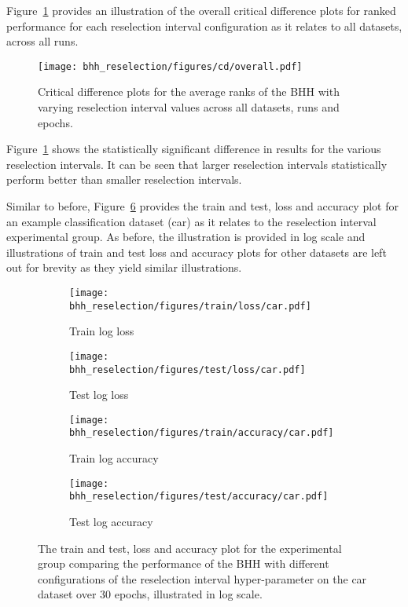 Figure~\ref{fig:results:reselection:descriptive:cd} provides an illustration of the overall critical difference plots for ranked performance for each reselection interval configuration as it relates to all datasets, across all runs.

\begin{figure}[htbp]
	\centering
	\texttt{[image: bhh\_reselection/figures/cd/overall.pdf]}
	\caption{Critical difference plots for the average ranks of the \acs{BHH} with varying reselection interval values across all datasets, runs and epochs.}
	\label{fig:results:reselection:descriptive:cd}
\end{figure}

Figure~\ref{fig:results:reselection:descriptive:cd} shows the statistically significant difference in results for the various reselection intervals. It can be seen that larger reselection intervals statistically perform better than smaller reselection intervals.

Similar to before, Figure~\ref{fig:results:reselection:figures:car} provides the train and test, loss and accuracy plot for an example classification dataset (car) as it relates to the reselection interval experimental group. As before, the illustration is provided in log scale and illustrations of train and test loss and accuracy plots for other datasets are left out for brevity as they yield similar illustrations.

\begin{figure}[htbp]
	\begin{subfigure}{0.5\textwidth}
		\centering
		\texttt{[image: bhh\_reselection/figures/train/loss/car.pdf]}
		\caption{Train log loss}
		\label{fig:results:reselection:figures:loss:train:car}
	\end{subfigure}
	\begin{subfigure}{0.5\textwidth}
		\centering
		\texttt{[image: bhh\_reselection/figures/test/loss/car.pdf]}
		\caption{Test log loss}
		\label{fig:results:reselection:figures:loss:test:car}
	\end{subfigure}
	\par\bigskip
	\begin{subfigure}{0.5\textwidth}
		\centering
		\texttt{[image: bhh\_reselection/figures/train/accuracy/car.pdf]}
		\caption{Train log accuracy}
		\label{fig:results:reselection:figures:accuracy:train:car}
	\end{subfigure}
	\begin{subfigure}{0.5\textwidth}
		\centering
		\texttt{[image: bhh\_reselection/figures/test/accuracy/car.pdf]}
		\caption{Test log accuracy}
		\label{fig:results:reselection:figures:accuracy:test:car}
	\end{subfigure}
	\par\bigskip
	\caption{The train and test, loss and accuracy plot for the experimental group comparing the performance of the \acs{BHH} with different configurations of the reselection interval hyper-parameter on the car dataset over 30 epochs, illustrated in log scale.}
	\label{fig:results:reselection:figures:car}
\end{figure}

